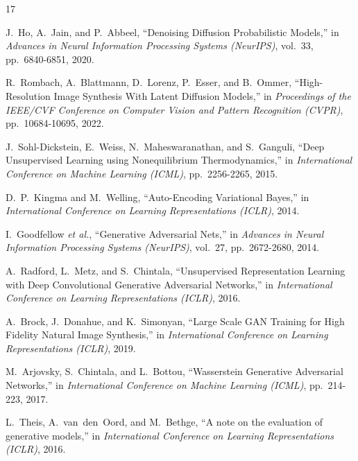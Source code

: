 \documentclass[10pt,a4paper]{article}
\begin{document}
\begin{thebibliography}{17}
\footnotesize
\setlength{\itemsep}{0.6pt}
\setlength{\parskip}{0pt}

J.~Ho, A.~Jain, and P.~Abbeel, ``Denoising Diffusion Probabilistic Models,'' in \textit{Advances in Neural Information Processing Systems (NeurIPS)}, vol.~33, pp.~6840-6851, 2020.

R.~Rombach, A.~Blattmann, D.~Lorenz, P.~Esser, and B.~Ommer, ``High-Resolution Image Synthesis With Latent Diffusion Models,'' in \textit{Proceedings of the IEEE/CVF Conference on Computer Vision and Pattern Recognition (CVPR)}, pp.~10684-10695, 2022.

J.~Sohl-Dickstein, E.~Weiss, N.~Maheswaranathan, and S.~Ganguli, ``Deep Unsupervised Learning using Nonequilibrium Thermodynamics,'' in \textit{International Conference on Machine Learning (ICML)}, pp.~2256-2265, 2015.

D.~P.~Kingma and M.~Welling, ``Auto-Encoding Variational Bayes,'' in \textit{International Conference on Learning Representations (ICLR)}, 2014.

I.~Goodfellow \textit{et al.}, ``Generative Adversarial Nets,'' in \textit{Advances in Neural Information Processing Systems (NeurIPS)}, vol.~27, pp.~2672-2680, 2014.

A.~Radford, L.~Metz, and S.~Chintala, ``Unsupervised Representation Learning with Deep Convolutional Generative Adversarial Networks,'' in \textit{International Conference on Learning Representations (ICLR)}, 2016.

A.~Brock, J.~Donahue, and K.~Simonyan, ``Large Scale GAN Training for High Fidelity Natural Image Synthesis,'' in \textit{International Conference on Learning Representations (ICLR)}, 2019.

M.~Arjovsky, S.~Chintala, and L.~Bottou, ``Wasserstein Generative Adversarial Networks,'' in \textit{International Conference on Machine Learning (ICML)}, pp.~214-223, 2017.

L.~Theis, A.~van~den~Oord, and M.~Bethge, ``A note on the evaluation of generative models,'' in \textit{International Conference on Learning Representations (ICLR)}, 2016.


\end{thebibliography}
\end{document}
